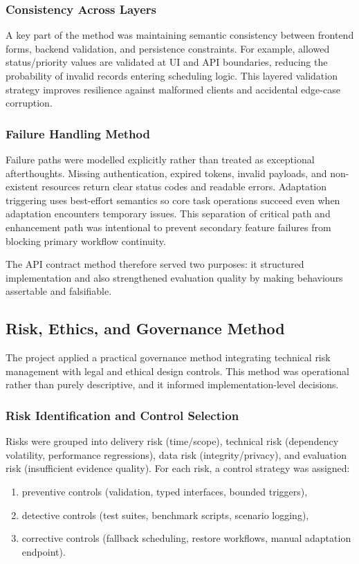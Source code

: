 \documentclass[12pt]{article}
\begin{document}
\subsubsection{Consistency Across Layers}
A key part of the method was maintaining semantic consistency between frontend forms, backend validation, and persistence constraints. For example, allowed status/priority values are validated at UI and API boundaries, reducing the probability of invalid records entering scheduling logic. This layered validation strategy improves resilience against malformed clients and accidental edge-case corruption.

\subsubsection{Failure Handling Method}
Failure paths were modelled explicitly rather than treated as exceptional afterthoughts. Missing authentication, expired tokens, invalid payloads, and non-existent resources return clear status codes and readable errors. Adaptation triggering uses best-effort semantics so core task operations succeed even when adaptation encounters temporary issues. This separation of critical path and enhancement path was intentional to prevent secondary feature failures from blocking primary workflow continuity.

The API contract method therefore served two purposes: it structured implementation and also strengthened evaluation quality by making behaviours assertable and falsifiable.

\subsection{Risk, Ethics, and Governance Method}
The project applied a practical governance method integrating technical risk management with legal and ethical design controls. This method was operational rather than purely descriptive, and it informed implementation-level decisions.

\subsubsection{Risk Identification and Control Selection}
Risks were grouped into delivery risk (time/scope), technical risk (dependency volatility, performance regressions), data risk (integrity/privacy), and evaluation risk (insufficient evidence quality). For each risk, a control strategy was assigned:
\begin{enumerate}
    \item preventive controls (validation, typed interfaces, bounded triggers),
    \item detective controls (test suites, benchmark scripts, scenario logging),
    \item corrective controls (fallback scheduling, restore workflows, manual adaptation endpoint).
\end{enumerate}
\end{document}
